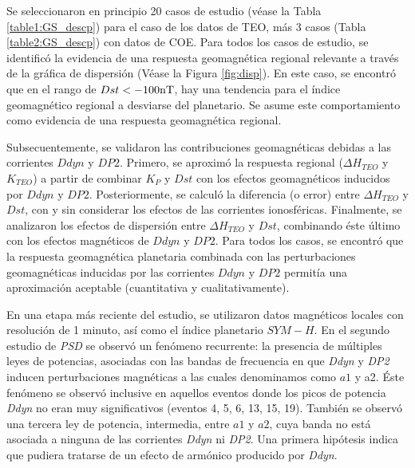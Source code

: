 Se seleccionaron en principio 20 casos de estudio (véase la Tabla \ref{table1:GS_descp}) para el caso de los datos de TEO, más 3 casos (Tabla \ref{table2:GS_descp}) con datos de COE. Para todos los casos de estudio, se identificó la evidencia de una respuesta geomagnética regional relevante a través de la gráfica de dispersión (Véase la Figura \ref{fig:disp}). En este caso, se encontró que en el rango de $Dst < -100 {\rm nT}$, hay una tendencia para el índice geomagnético regional a desviarse del planetario. Se asume este comportamiento como evidencia de una respuesta geomagnética regional.
\vspace{1 em}

Subsecuentemente, se validaron las contribuciones geomagnéticas debidas a las corrientes $Ddyn$ y $DP2$. Primero, se aproximó la respuesta regional ($\Delta H_{TEO}$ y $K_{TEO}$) a partir de combinar $K_P$ y $Dst$ con los efectos geomagnéticos inducidos por $Ddyn$ y $DP2$. Posteriormente, se calculó la diferencia (o error) entre $\Delta H_{TEO}$ y $Dst$, con y sin considerar los efectos de las corrientes ionosféricas. Finalmente, se analizaron los efectos de dispersión entre $\Delta H_{TEO}$ y $Dst$, combinando éste último con los efectos magnéticos de $Ddyn$ y $DP2$. Para todos los casos, se encontró que la respuesta geomagnética planetaria combinada con las perturbaciones geomagnéticas inducidas por las corrientes $Ddyn$ y $DP2$ permitía una aproximación aceptable (cuantitativa y cualitativamente).
\vspace{1 em}

En una etapa más reciente del estudio, se utilizaron datos magnéticos locales con resolución de 1 minuto, así como el índice planetario $SYM-H$. En el segundo estudio de \emph{PSD} se observó un fenómeno recurrente: la presencia de múltiples leyes de potencias, asociadas con las bandas de frecuencia en que \emph{Ddyn} y \emph{DP2} inducen perturbaciones magnéticas a las cuales denominamos como $a1$ y a2. Éste fenómeno se observó inclusive en aquellos eventos donde los picos de potencia \emph{Ddyn} no eran muy significativos (eventos 4, 5, 6, 13, 15, 19). También se observó una tercera ley de potencia, intermedia, entre $a1$ y $a2$, cuya banda no está asociada a ninguna de las corrientes \emph{Ddyn} ni \emph{DP2}. Una primera hipótesis indica que pudiera tratarse de un efecto de armónico producido por \emph{Ddyn}.
\vspace{1 em}


